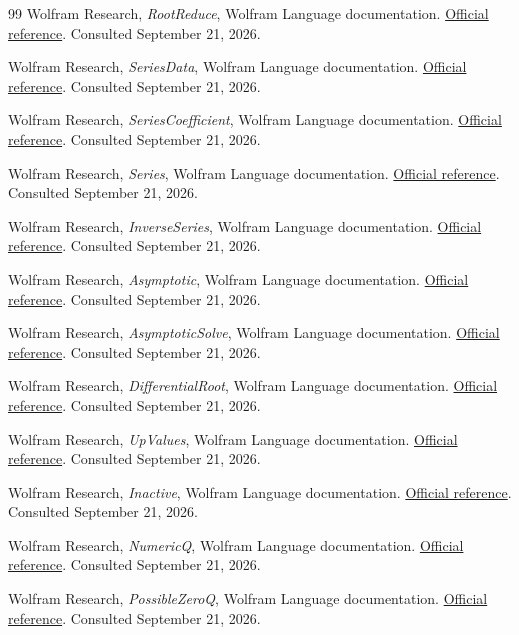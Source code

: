 \documentclass[11pt,letterpaper]{article}
\numberwithin{equation}{section}
\theoremstyle{definition}
\theoremstyle{remark}\newtheorem{remark}[theorem]{Remark}
\begin{document}
\begin{thebibliography}{99}
Wolfram Research, \emph{RootReduce}, Wolfram Language documentation.
\href{https://reference.wolfram.com/language/ref/RootReduce.html}{Official reference}.
Consulted September 21, 2026.

Wolfram Research, \emph{SeriesData}, Wolfram Language documentation.
\href{https://reference.wolfram.com/language/ref/SeriesData.html}{Official reference}.
Consulted September 21, 2026.

Wolfram Research, \emph{SeriesCoefficient}, Wolfram Language documentation.
\href{https://reference.wolfram.com/language/ref/SeriesCoefficient.html}{Official reference}.
Consulted September 21, 2026.

Wolfram Research, \emph{Series}, Wolfram Language documentation.
\href{https://reference.wolfram.com/language/ref/Series.html}{Official reference}.
Consulted September 21, 2026.

Wolfram Research, \emph{InverseSeries}, Wolfram Language documentation.
\href{https://reference.wolfram.com/language/ref/InverseSeries.html}{Official reference}.
Consulted September 21, 2026.

Wolfram Research, \emph{Asymptotic}, Wolfram Language documentation.
\href{https://reference.wolfram.com/language/ref/Asymptotic.html}{Official reference}.
Consulted September 21, 2026.

Wolfram Research, \emph{AsymptoticSolve}, Wolfram Language documentation.
\href{https://reference.wolfram.com/language/ref/AsymptoticSolve.html}{Official reference}.
Consulted September 21, 2026.

Wolfram Research, \emph{DifferentialRoot}, Wolfram Language documentation.
\href{https://reference.wolfram.com/language/ref/DifferentialRoot.html}{Official reference}.
Consulted September 21, 2026.

Wolfram Research, \emph{UpValues}, Wolfram Language documentation.
\href{https://reference.wolfram.com/language/ref/UpValues.html}{Official reference}.
Consulted September 21, 2026.

Wolfram Research, \emph{Inactive}, Wolfram Language documentation.
\href{https://reference.wolfram.com/language/ref/Inactive.html}{Official reference}.
Consulted September 21, 2026.

Wolfram Research, \emph{NumericQ}, Wolfram Language documentation.
\href{https://reference.wolfram.com/language/ref/NumericQ.html}{Official reference}.
Consulted September 21, 2026.

Wolfram Research, \emph{PossibleZeroQ}, Wolfram Language documentation.
\href{https://reference.wolfram.com/language/ref/PossibleZeroQ.html}{Official reference}.
Consulted September 21, 2026.
\end{thebibliography}
\end{document}

